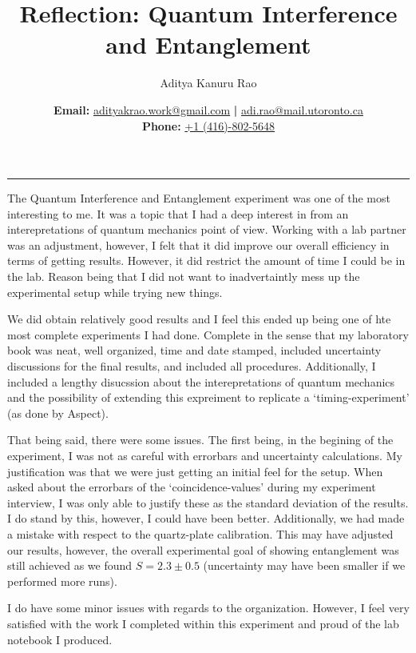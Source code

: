 \documentclass[11pt,a4paper]{article}
\newcommand\psetnum{Reflection: Quantum Interference and Entanglement}
\newcommand\yourname{Aditya Kanuru Rao}
\begin{document}
	\title{\vspace{-4cm}\psetnum}
        \author{\yourname}
	\date{\vspace{-0.3em}\textbf{Email:} \href{mailto:adityakrao.work@gmail.com}{adityakrao.work@gmail.com} \textbf{|} \href{mailto:adi.rao@mail.utoronto.ca}{adi.rao@mail.utoronto.ca}\\\textbf{Phone:} \href{tel:14168025648}{+1 (416)-802-5648}}
        \vspace{0cm}
	\maketitle
\vspace{-1.2cm}
\rule{\linewidth}{0.5pt}

\textbf{}

The Quantum Interference and Entanglement experiment was one of the most interesting to me. It was a topic that I had a deep interest in from an interepretations of quantum mechanics point of view. Working with a lab partner was an adjustment, however, I felt that it did improve our overall efficiency in terms of getting results. However, it did restrict the amount of time I could be in the lab. Reason being that I did not want to inadvertaintly mess up the experimental setup while trying new things.

We did obtain relatively good results and I feel this ended up being one of hte most complete experiments I had done. Complete in the sense that my laboratory book was neat, well organized, time and date stamped, included uncertainty discussions for the final results, and included all procedures. Additionally, I included a lengthy disucssion about the interepretations of quantum mechanics and the possibility of extending this expreiment to replicate a `timing-experiment' (as done by Aspect).

That being said, there were some issues. The first being, in the begining of the experiment, I was not as careful with errorbars and uncertainty calculations. My justification was that we were just getting an initial feel for the setup. When asked about the errorbars of the `coincidence-values' during my experiment interview, I was only able to justify these as the standard deviation of the results. I do stand by this, however, I could have been better. Additionally, we had made a mistake with respect to the quartz-plate calibration. This may have adjusted our results, however, the overall experimental goal of showing entanglement was still achieved as we found $S=2.3\pm 0.5$ (uncertainty may have been smaller if we performed more runs).

I do have some minor issues with regards to the organization. However, I feel very satisfied with the work I completed within this experiment and proud of the lab notebook I produced.
\end{document}
